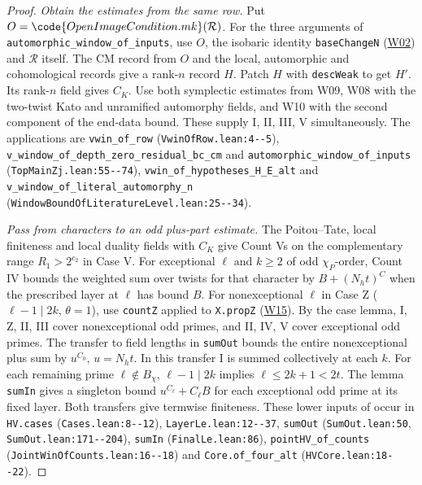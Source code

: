 \begin{proof}
\emph{Obtain the estimates from the same row.}
Put $O=\code{OpenImageCondition.mk}(\mathcal R)$. For the three arguments
of \nolinkurl{automorphic_window_of_inputs}, use $O$, the
isobaric identity \nolinkurl{baseChangeN} (\hyperref[sub:W02]{W02})
and $\mathcal R$ itself. The CM record from $O$ and the local, automorphic
and cohomological records give a rank-$n$ record $H$. Patch $H$ with
\nolinkurl{descWeak} to get $H'$. Its rank-$n$ field gives $C_K$.
Use both symplectic estimates from W09, W08 with the two-twist Kato
and unramified automorphy fields, and W10 with the second component of
the end-data bound. These supply I, II, III, V simultaneously.
The applications are \nolinkurl{vwin_of_row}
(\nolinkurl{VwinOfRow.lean:4--5}),
\nolinkurl{v_window_of_depth_zero_residual_bc_cm} and
\nolinkurl{automorphic_window_of_inputs} (\nolinkurl{TopMainZj.lean:55--74}),
\nolinkurl{vwin_of_hypotheses_H_E_alt} and
\nolinkurl{v_window_of_literal_automorphy_n}
(\nolinkurl{WindowBoundOfLiteratureLevel.lean:25--34}).

\emph{Pass from characters to an odd plus-part estimate.}
The Poitou--Tate, local finiteness and local duality fields with $C_K$
give Count Vs on the complementary range $R_1>2^{c_2}$ in Case V.
For exceptional $\ell$ and $k\ge2$ of odd $\chi_P$-order, Count IV
bounds the weighted sum over twists for that character by
$B+(N_ht)^C$ when the prescribed layer at $\ell$ has bound $B$.
For nonexceptional $\ell$ in Case Z ($\ell-1\mid2k$, $\theta=1$),
use \nolinkurl{countZ} applied to \nolinkurl{X.propZ}
(\hyperref[sub:W15]{W15}). By the case lemma, I, Z, II, III cover
nonexceptional odd primes, and II, IV, V cover exceptional odd primes.
The transfer to field lengths in \nolinkurl{sumOut} bounds the entire
nonexceptional plus sum by $u^{C_0}$, $u=N_ht$. In this transfer
I is summed collectively at each $k$. For each remaining prime
$\ell\notin B_\chi$, $\ell-1\mid2k$ implies $\ell\le2k+1<2t$.
The lemma \nolinkurl{sumIn} gives a singleton bound
$u^{C_\ell}+C_\ell B$ for each exceptional odd prime at its fixed
layer. Both transfers give termwise finiteness. These lower inputs of
 occur in \nolinkurl{HV.cases} (\nolinkurl{Cases.lean:8--12}),
\nolinkurl{LayerLe.lean:12--37}, \nolinkurl{sumOut}
(\nolinkurl{SumOut.lean:50}, \nolinkurl{SumOut.lean:171--204}),
\nolinkurl{sumIn} (\nolinkurl{FinalLe.lean:86}),
\nolinkurl{pointHV_of_counts} (\nolinkurl{JointWinOfCounts.lean:16--18})
and \nolinkurl{Core.of_four_alt} (\nolinkurl{HVCore.lean:18--22}).


\end{proof}

